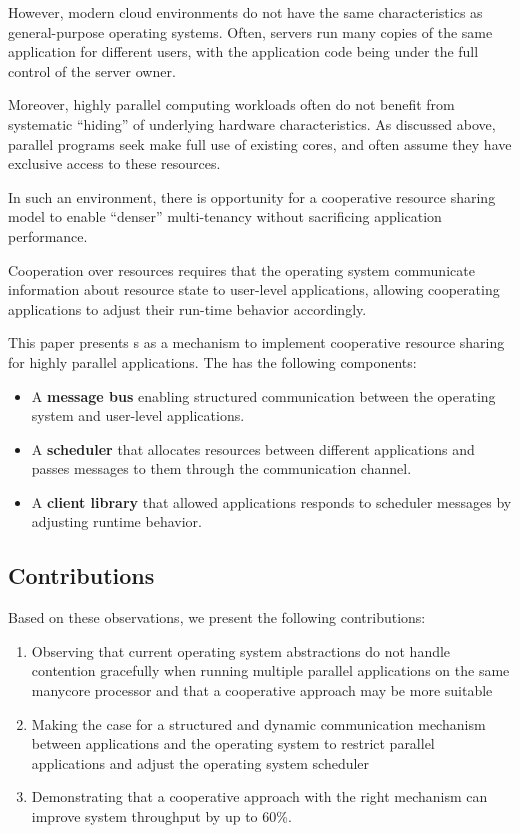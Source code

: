 However, modern cloud environments do not have the same characteristics as general-purpose operating systems. Often, servers run many copies of the same application for different users, with the application code being under the full control of the server owner.

Moreover, highly parallel computing workloads often do not benefit from systematic ``hiding'' of underlying hardware characteristics. As discussed above, parallel programs seek make full use of existing cores, and often assume they have exclusive access to these resources.

In such an environment, there is opportunity for a cooperative resource sharing model to enable ``denser'' multi-tenancy without sacrificing application performance.

Cooperation over resources requires that the operating system communicate information about resource state to user-level applications, allowing cooperating applications to adjust their run-time behavior accordingly.

This paper presents \mechfull{}s as a mechanism to implement cooperative resource sharing for highly parallel applications. The \mech{} has the following components:
\begin{itemize}
    \item A \textbf{message bus} enabling structured communication between the operating system and user-level applications.
    \item A \textbf{scheduler} that allocates resources between different applications and passes messages to them through the communication channel.
    \item A \textbf{client library} that allowed applications responds to scheduler messages by adjusting runtime behavior.
\end{itemize}

\subsection{Contributions}
Based on these observations, we present the following contributions:
\begin{enumerate}
  \item Observing that current operating system abstractions do not handle contention gracefully when running multiple parallel applications on the same manycore processor and that a cooperative approach may be more suitable
  \item Making the case for a structured and dynamic communication mechanism between applications and the operating system to restrict parallel applications and adjust the operating system scheduler
  \item Demonstrating that a cooperative approach with the right mechanism can improve system throughput by up to 60\%.
\end{enumerate}
